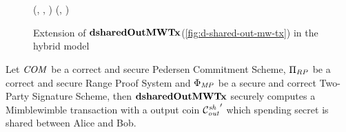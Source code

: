 \begin{figure}
\begin{center}
{\begin{varwidth}{\textwidth}
{            \varTx \opFunResult \procFinTx{\funStarAlt{\varPreTx}}{\varSecKeyAlice}{\varNonceAlice} \\
            \< \sendmessageright*{\varTx} \\
            \pcreturn (\varTx, \funStar{\varSpendableCoinAlice}, \funStar{\varPtSpendableCoinAlice}) \< \< \pcreturn (\varTx, \funStar{\varPtSpendableCoinBob})
            }
        \end{varwidth}
        }
    \end{center}
    \caption{Extension of $\mathbf{dsharedOutMWTx}$(\cref{fig:d-shared-out-mw-tx}) in the hybrid model}  \label{fig:atom:hybrid-sharedinp}
\end{figure}

\begin{theorem}
    \label{teo:atom:sec-sharedout-tx}
    Let $\mathit{COM}$ be a correct and secure Pedersen Commitment Scheme, $\Pi_{RP}$ be a correct and secure Range Proof System and $\Phi_{\mathit{MP}}$ be a secure and correct Two-Party Signature Scheme, then $\mathbf{dsharedOutMWTx}$ securely computes a Mimblewimble transaction with a output coin ${\mathcal{C}_{\mathit{out}}^{\mathit{sh}}}'$ which spending secret is shared between Alice and Bob.
\end{theorem}

